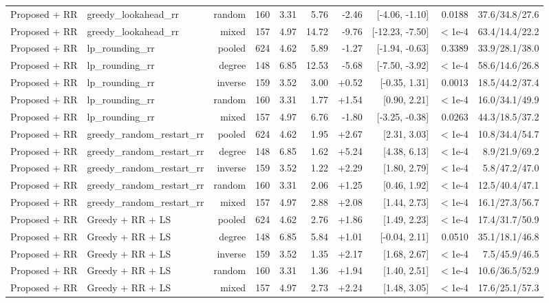 \begin{table}[t]
{\begin{tabular}{llrrrrrrrr}
Proposed + RR & greedy\_lookahead\_rr & random & 160 & 3.31 & 5.76 & -2.46 & [-4.06, -1.10] & 0.0188 & 37.6/34.8/27.6 \\
Proposed + RR & greedy\_lookahead\_rr & mixed & 157 & 4.97 & 14.72 & -9.76 & [-12.23, -7.50] & $<$1e-4 & 63.4/14.4/22.2 \\
Proposed + RR & lp\_rounding\_rr & pooled & 624 & 4.62 & 5.89 & -1.27 & [-1.94, -0.63] & 0.3389 & 33.9/28.1/38.0 \\
Proposed + RR & lp\_rounding\_rr & degree & 148 & 6.85 & 12.53 & -5.68 & [-7.50, -3.92] & $<$1e-4 & 58.6/14.6/26.8 \\
Proposed + RR & lp\_rounding\_rr & inverse & 159 & 3.52 & 3.00 & +0.52 & [-0.35, 1.31] & 0.0013 & 18.5/44.2/37.4 \\
Proposed + RR & lp\_rounding\_rr & random & 160 & 3.31 & 1.77 & +1.54 & [0.90, 2.21] & $<$1e-4 & 16.0/34.1/49.9 \\
Proposed + RR & lp\_rounding\_rr & mixed & 157 & 4.97 & 6.76 & -1.80 & [-3.25, -0.38] & 0.0263 & 44.3/18.5/37.2 \\
Proposed + RR & greedy\_random\_restart\_rr & pooled & 624 & 4.62 & 1.95 & +2.67 & [2.31, 3.03] & $<$1e-4 & 10.8/34.4/54.7 \\
Proposed + RR & greedy\_random\_restart\_rr & degree & 148 & 6.85 & 1.62 & +5.24 & [4.38, 6.13] & $<$1e-4 & 8.9/21.9/69.2 \\
Proposed + RR & greedy\_random\_restart\_rr & inverse & 159 & 3.52 & 1.22 & +2.29 & [1.80, 2.79] & $<$1e-4 & 5.8/47.2/47.0 \\
Proposed + RR & greedy\_random\_restart\_rr & random & 160 & 3.31 & 2.06 & +1.25 & [0.46, 1.92] & $<$1e-4 & 12.5/40.4/47.1 \\
Proposed + RR & greedy\_random\_restart\_rr & mixed & 157 & 4.97 & 2.88 & +2.08 & [1.44, 2.73] & $<$1e-4 & 16.1/27.3/56.7 \\
Proposed + RR & Greedy + RR + LS & pooled & 624 & 4.62 & 2.76 & +1.86 & [1.49, 2.23] & $<$1e-4 & 17.4/31.7/50.9 \\
Proposed + RR & Greedy + RR + LS & degree & 148 & 6.85 & 5.84 & +1.01 & [-0.04, 2.11] & 0.0510 & 35.1/18.1/46.8 \\
Proposed + RR & Greedy + RR + LS & inverse & 159 & 3.52 & 1.35 & +2.17 & [1.68, 2.67] & $<$1e-4 & 7.5/45.9/46.5 \\
Proposed + RR & Greedy + RR + LS & random & 160 & 3.31 & 1.36 & +1.94 & [1.40, 2.51] & $<$1e-4 & 10.6/36.5/52.9 \\
Proposed + RR & Greedy + RR + LS & mixed & 157 & 4.97 & 2.73 & +2.24 & [1.48, 3.05] & $<$1e-4 & 17.6/25.1/57.3 \\

\end{tabular}}
\end{table}
